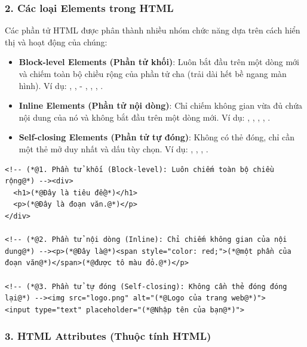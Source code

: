 \subsubsection{2. Các loại Elements trong HTML}
Các phần tử HTML được phân thành nhiều nhóm chức năng dựa trên cách hiển thị và hoạt động của chúng:
\begin{itemize}[leftmargin=1.8em, itemsep=4pt, parsep=0pt]
    \item \textbf{Block-level Elements (Phần tử khối)}: Luôn bắt đầu trên một dòng mới và chiếm toàn bộ chiều rộng của phần tử cha (trải dài hết bề ngang màn hình). Ví dụ: , ,  - , , , .
    \item \textbf{Inline Elements (Phần tử nội dòng)}: Chỉ chiếm không gian vừa đủ chứa nội dung của nó và không bắt đầu trên một dòng mới. Ví dụ: , , , , .
    \item \textbf{Self-closing Elements (Phần tử tự đóng)}: Không có thẻ đóng, chỉ cần một thẻ mở duy nhất và dấu \codeinline{/} tùy chọn. Ví dụ: , , , .
\end{itemize}

\begin{codeWindow}
\begin{lstlisting}[language=HTML5]
<!-- (*@1. Phần tử khối (Block-level): Luôn chiếm toàn bộ chiều rộng@*) --><div>
  <h1>(*@Đây là tiêu đề@*)</h1>
  <p>(*@Đây là đoạn văn.@*)</p>
</div>

<!-- (*@2. Phần tử nội dòng (Inline): Chỉ chiếm không gian của nội dung@*) --><p>(*@Đây là@*)<span style="color: red;">(*@một phần của đoạn văn@*)</span>(*@được tô màu đỏ.@*)</p>

<!-- (*@3. Phần tử tự đóng (Self-closing): Không cần thẻ đóng đóng lại@*) --><img src="logo.png" alt="(*@Logo của trang web@*)">
<input type="text" placeholder="(*@Nhập tên của bạn@*)">
\end{lstlisting}
\end{codeWindow}

\subsubsection{3. HTML Attributes (Thuộc tính HTML)}

